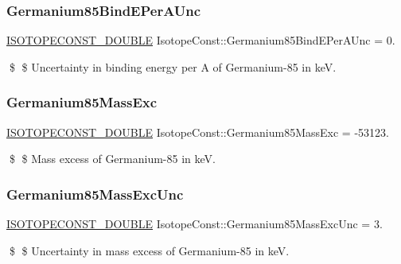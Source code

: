 \subsubsection{\texorpdfstring{Germanium85\+Bind\+E\+Per\+A\+Unc}{Germanium85BindEPerAUnc}}
{\footnotesize\ttfamily \mbox{\hyperlink{group___isotope_const-_macros_ga8f45a7272ce02c0b4c65c44636ed719a}{I\+S\+O\+T\+O\+P\+E\+C\+O\+N\+S\+T\+\_\+\+D\+O\+U\+B\+LE}} Isotope\+Const\+::\+Germanium85\+Bind\+E\+Per\+A\+Unc = 0.}

\$ \$ Uncertainty in binding energy per A of Germanium-\/85 in keV. \mbox{\label{group___isotope_const-_germanium-_ge85_ga6d2bc4b7adf9c3d1f4a4b186010eb307}} 
\subsubsection{\texorpdfstring{Germanium85\+Mass\+Exc}{Germanium85MassExc}}
{\footnotesize\ttfamily \mbox{\hyperlink{group___isotope_const-_macros_ga8f45a7272ce02c0b4c65c44636ed719a}{I\+S\+O\+T\+O\+P\+E\+C\+O\+N\+S\+T\+\_\+\+D\+O\+U\+B\+LE}} Isotope\+Const\+::\+Germanium85\+Mass\+Exc = -\/53123.}

\$ \$ Mass excess of Germanium-\/85 in keV. \mbox{\label{group___isotope_const-_germanium-_ge85_ga68fe78847a220f8d83b6641ecc556512}} 
\subsubsection{\texorpdfstring{Germanium85\+Mass\+Exc\+Unc}{Germanium85MassExcUnc}}
{\footnotesize\ttfamily \mbox{\hyperlink{group___isotope_const-_macros_ga8f45a7272ce02c0b4c65c44636ed719a}{I\+S\+O\+T\+O\+P\+E\+C\+O\+N\+S\+T\+\_\+\+D\+O\+U\+B\+LE}} Isotope\+Const\+::\+Germanium85\+Mass\+Exc\+Unc = 3.}

\$ \$ Uncertainty in mass excess of Germanium-\/85 in keV. \mbox{\label{group___isotope_const-_germanium-_ge85_ga2e31e38dc050a0ed68867686cb0b0fe3}} 
